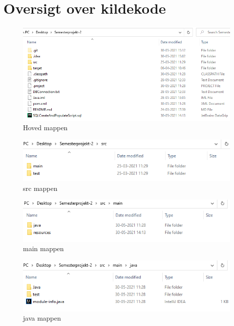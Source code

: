 \section{Oversigt over kildekode}

\begin{figure}[H]
    \centering
    \includegraphics{images/MainFolder.PNG}
    \caption{Hoved mappen}
    \label{fig:my_label}
\end{figure}

\begin{figure}[H]
    \centering
    \includegraphics{images/src.PNG}
    \caption{src mappen}
    \label{fig:my_label}
\end{figure}

\begin{figure}[H]
    \centering
    \includegraphics{images/main.PNG}
    \caption{main mappen}
    \label{fig:my_label}
\end{figure}

\begin{figure}[H]
    \centering
    \includegraphics{images/javasmol.PNG}
    \caption{java mappen}
    \label{fig:my_label}
\end{figure}


